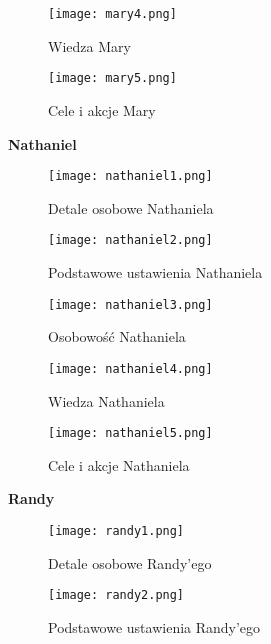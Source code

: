 \begin{figure}[h!]
    \centering
    \texttt{[image: mary4.png]}
    \caption{Wiedza Mary}
    \label{fig:app1_mary_4}
\end{figure}

\begin{figure}[h!]
    \centering
    \texttt{[image: mary5.png]}
    \caption{Cele i akcje Mary}
    \label{fig:app1_mary_5}
\end{figure}

\textbf{Nathaniel}

\begin{figure}[h!]
    \centering
    \texttt{[image: nathaniel1.png]}
    \caption{Detale osobowe Nathaniela}
    \label{fig:app1_nathaniel_1}
\end{figure}

\begin{figure}[h!]
    \centering
    \texttt{[image: nathaniel2.png]}
    \caption{Podstawowe ustawienia Nathaniela}
    \label{fig:app1_nathaniel_2}
\end{figure}

\begin{figure}[h!]
    \centering
    \texttt{[image: nathaniel3.png]}
    \caption{Osobowość Nathaniela}
    \label{fig:app1_nathaniel_3}
\end{figure}

\begin{figure}[h!]
    \centering
    \texttt{[image: nathaniel4.png]}
    \caption{Wiedza Nathaniela}
    \label{fig:app1_nathaniel_4}
\end{figure}

\begin{figure}[h!]
    \centering
    \texttt{[image: nathaniel5.png]}
    \caption{Cele i akcje Nathaniela}
    \label{fig:app1_nathaniel_5}
\end{figure}

\textbf{Randy}

\begin{figure}[h!]
    \centering
    \texttt{[image: randy1.png]}
    \caption{Detale osobowe Randy'ego}
    \label{fig:app1_randy_1}
\end{figure}

\begin{figure}[h!]
    \centering
    \texttt{[image: randy2.png]}
    \caption{Podstawowe ustawienia Randy'ego}
    \label{fig:app1_randy_2}
\end{figure}


